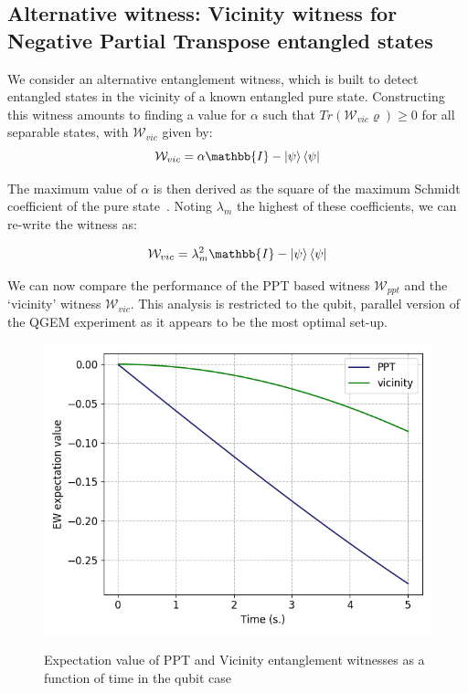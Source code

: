 \documentclass[%
 reprint,
 superscriptaddress,
 amsmath,
 amssymb,
 aps,
 longbibliography
]{revtex4-2}
\begin{document}
\begin{appendices}
\section{Alternative witness: Vicinity witness for Negative Partial Transpose entangled states} \hfill \break

\indent We consider an alternative entanglement witness, which is built to detect entangled states in the vicinity of a known entangled pure state. Constructing this witness amounts to finding a value for $\alpha$ such that $ Tr(\mathcal{W}_{vic}\varrho)\geqslant0$ for all separable states, with $\mathcal{W}_{vic}$ given by:
		\begin{equation}
			\mathcal{W}_{vic}=\alpha\mathbb{I} - \Ket{\psi}\Bra{\psi}
		\end{equation}

\indent The maximum value of $\alpha$ is then derived as the square of the maximum Schmidt coefficient of the pure state~\cite{Bourennane2004}. Noting $\lambda_m$ the highest of these coefficients, we can re-write the witness as:

		\begin{equation}
			\mathcal{W}_{vic}=\lambda_m^2\mathbb{I} - \Ket{\psi}\Bra{\psi}
		\end{equation}

\indent We can now compare the performance of the PPT based witness $\mathcal{W}_{ppt}$ and the `vicinity' witness $\mathcal{W}_{vic}$. This analysis is restricted to the qubit, parallel version of the QGEM experiment as it appears to be the most optimal set-up. 

	\begin{figure}
	\centering
	    \includegraphics[width=1.0\columnwidth]{EW_comparison.png}\par\medskip
	\caption{Expectation value of PPT and Vicinity entanglement witnesses as a function of time in the qubit case}\par\medskip \label{fig:EW_comp}
	\end{figure}


\end{appendices}
\end{document}
